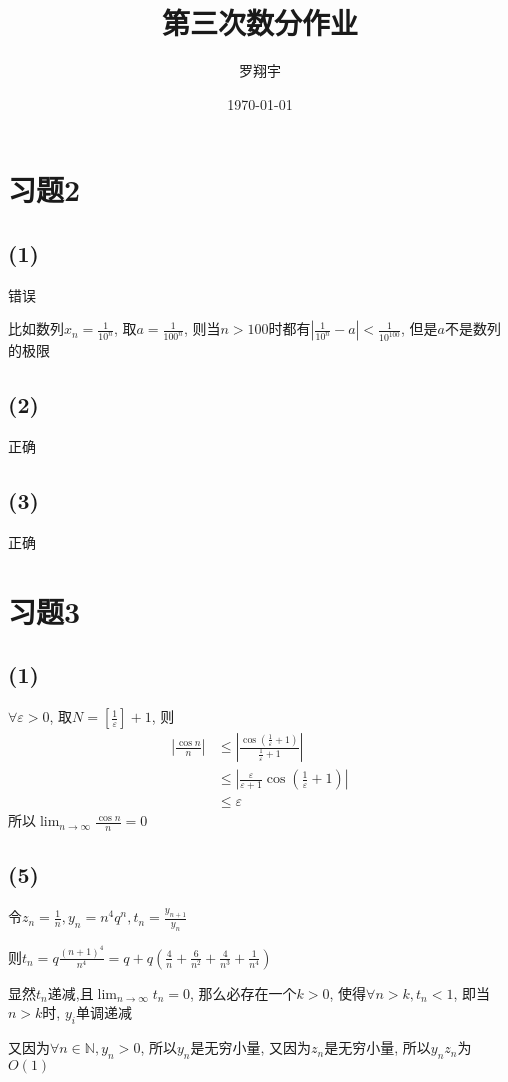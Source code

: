 \documentclass[a4paper,11pt]{article}
\title{第三次数分作业}
\author{罗翔宇}
\date{\today}
\begin{document}
\maketitle

\section*{习题2}
\subsection*{(1)}
错误

比如数列$x_n=\frac{1}{10^n}$, 取$a=\frac{1}{100^n}$, 则当$n>100$时都有$|\frac{1}{10^n}-a|<\frac{1}{10^{100}}$, 但是$a$不是数列的极限
\subsection*{(2)}
正确
\subsection*{(3)}
正确
\section*{习题3}
\subsection*{(1)}
$\forall \varepsilon>0$, 取$N=[\frac{1}{\varepsilon}]+1$, 则
\begin{align*}
	|\frac{\cos n}{n}| &\le |\frac{\cos(\frac{1}{\varepsilon} +1)}{\frac{1}{\varepsilon}+1}|\\
	&\le |\frac{\varepsilon}{\varepsilon+1}\cos(\frac{1}{\varepsilon}+1)|\\
	&\le \varepsilon
\end{align*}
所以$\displaystyle\lim_{n\to \infty}\frac{\cos n}{n}=0$
\subsection*{(5)}
令$z_n=\frac{1}{n}, y_n=n^4q^n, t_n=\frac{y_{n+1}}{y_n}$

则$t_n=q\frac{(n+1)^4}{n^4}=q+q(\frac{4}{n}+\frac{6}{n^2}+\frac{4}{n^3}+\frac{1}{n^4})$

显然$t_n$递减,且$\displaystyle \lim_{n\rightarrow \infty}t_n=0$, 那么必存在一个$k > 0$, 使得$\forall n > k, t_n < 1$, 即当$n > k$时, $y_i$单调递减

又因为$\forall n \in \mathbb{N}, y_n > 0$, 所以$y_n$是无穷小量, 又因为$z_n$是无穷小量, 所以$y_nz_n$为$O(1)$
\end{document}
